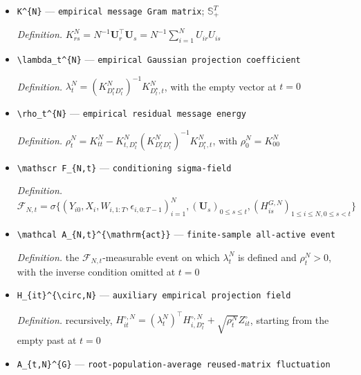 \documentclass{article}
\begin{document}
\begin{itemize}
  \item \texttt{K\textasciicircum{}\{N\}\allowbreak{}} --- \texttt{empirical message Gram matrix}; \(\mathbb S_+^T\)
  \par\smallskip\noindent\emph{Definition.} \(K_{rs}^{N}=N^{-1}\mathbf U_r^{\top}\mathbf U_s=N^{-1}\sum_{i=1}^NU_{ir}U_{is}\)
  \item \texttt{\textbackslash{}\allowbreak{}lambda\_\allowbreak{}t\textasciicircum{}\{N\}\allowbreak{}} --- \texttt{empirical Gaussian projection coefficient}
  \par\smallskip\noindent\emph{Definition.} \(\lambda_t^{N}=(K_{D_t^{\star}D_t^{\star}}^{N})^{-1}K_{D_t^{\star},t}^{N}\), with the empty vector at \(t=0\)
  \item \texttt{\textbackslash{}\allowbreak{}rho\_\allowbreak{}t\textasciicircum{}\{N\}\allowbreak{}} --- \texttt{empirical residual message energy}
  \par\smallskip\noindent\emph{Definition.} \(\rho_t^{N}=K_{tt}^{N}-K_{t,D_t^{\star}}^{N}(K_{D_t^{\star}D_t^{\star}}^{N})^{-1}K_{D_t^{\star},t}^{N}\), with \(\rho_0^{N}=K_{00}^{N}\)
  \item \texttt{\textbackslash{}\allowbreak{}mathscr F\_\allowbreak{}\{N,\allowbreak{}t\}\allowbreak{}} --- \texttt{conditioning sigma-\allowbreak{}field}
  \par\smallskip\noindent\emph{Definition.} \(\mathscr F_{N,t}=\sigma\{(Y_{i0},X_i,W_{i,1:T},\epsilon_{i,0:T-1})_{i=1}^N,(\mathbf U_s)_{0\le s\le t},(H_{is}^{G,N})_{1\le i\le N,0\le s<t}\}\)
  \item \texttt{\textbackslash{}\allowbreak{}mathcal A\_\allowbreak{}\{N,\allowbreak{}t\}\allowbreak{}\textasciicircum{}\{\textbackslash{}\allowbreak{}mathrm\{act\}\allowbreak{}\}\allowbreak{}} --- \texttt{finite-\allowbreak{}sample all-\allowbreak{}active event}
  \par\smallskip\noindent\emph{Definition.} the \(\mathscr F_{N,t}\)-measurable event on which \(\lambda_t^{N}\) is defined and \(\rho_t^{N}>0\), with the inverse condition omitted at \(t=0\)
  \item \texttt{H\_\allowbreak{}\{it\}\allowbreak{}\textasciicircum{}\{\textbackslash{}\allowbreak{}circ,\allowbreak{}N\}\allowbreak{}} --- \texttt{auxiliary empirical projection field}
  \par\smallskip\noindent\emph{Definition.} recursively, \(H_{it}^{\circ,N}=(\lambda_t^{N})^{\top}H_{i,D_t^{\star}}^{\circ,N}+\sqrt{\rho_t^{N}}Z_{it}^{\circ}\), starting from the empty past at \(t=0\)
  \item \texttt{A\_\allowbreak{}\{t,\allowbreak{}N\}\allowbreak{}\textasciicircum{}\{G\}\allowbreak{}} --- \texttt{root-\allowbreak{}population-\allowbreak{}average reused-\allowbreak{}matrix fluctuation}

\end{itemize}
\end{document}
